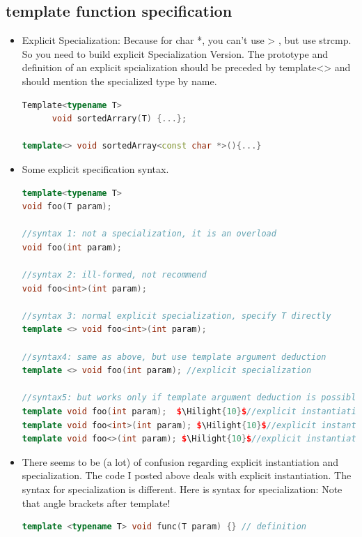 \documentclass[a4paper,11pt,twoside]{book}
\newcommand{\Hilight}[1]{\makebox[0pt][l]{\color{yellow}\rule[-3pt]{#1em}{11pt}}}
\newcommand{\Hilight}[1]{}
\begin{document}
\subsection{template function specification}
\begin{itemize}

	\item Explicit Specialization: Because for char *, you can't use > , but use strcmp.  So you need to build explicit Specialization Version. The prototype and definition of an explicit spcialization should be preceded by template<> and should mention the specialized type by name.
\begin{lstlisting}[frame=single, language=c++]
Template<typename T>
      void sortedArrary(T) {...};

template<> void sortedArray<const char *>(){...}
\end{lstlisting}

\item Some explicit specification syntax.
\begin{lstlisting}[frame=single, language=c++]
template<typename T>
void foo(T param);

//syntax 1: not a specialization, it is an overload
void foo(int param);

//syntax 2: ill-formed, not recommend
void foo<int>(int param);

//syntax 3: normal explicit specialization, specify T directly
template <> void foo<int>(int param);

//syntax4: same as above, but use template argument deduction
template <> void foo(int param); //explicit specialization

//syntax5: but works only if template argument deduction is possible!
template void foo(int param);  $\Hilight{10}$//explicit instantiation
template void foo<int>(int param); $\Hilight{10}$//explicit instantiation
template void foo<>(int param); $\Hilight{10}$//explicit instantiation
\end{lstlisting}

\item There seems to be (a lot) of confusion regarding explicit instantiation and specialization. The code I posted above deals with explicit instantiation. The syntax for specialization is different. Here is syntax for specialization: Note that angle brackets after template!

\begin{lstlisting}[frame=single, language=c++]
template <typename T> void func(T param) {} // definition


\end{lstlisting}
\end{itemize}
\end{document}

